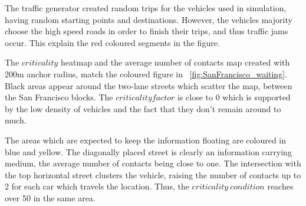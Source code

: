 The traffic generator created random trips for the vehicles used in simulation,
having random starting points and destinations. However, the vehicles majority
choose the high speed roads in order to finish their trips, and thus traffic
jams occur. This explain the red coloured segments in the figure.

The $criticality$ heatmap and the average number of contacts map created
with 200m anchor radius, match the coloured figure in
~\ref{fig:SanFrancisco_waiting}. Black areas appear around the two-lane streets
which scatter the map, between the San Francisco blocks. The $criticality
factor$ is close to 0 which is supported by the low density of vehicles and the
fact that they don't remain around to much. 

The areas which are expected to keep the information floating are coloured in
blue and yellow. The diagonally placed street is clearly an information carrying
medium, the average number of contacts being close to one. The intersection with
the top horizontal street clusters the vehicle, raising the number of contacts
up to 2 for each car which travels the location. Thus, the $criticality\
condition$ reaches over 50 in the same area.

